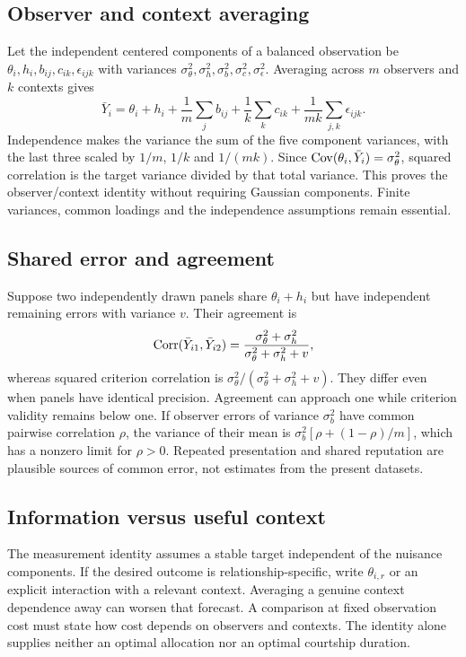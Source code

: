 \subsection{Observer and context averaging}
Let the independent centered components of a balanced observation be $\theta_i,h_i,b_{ij},c_{ik},\epsilon_{ijk}$ with variances $\sigma_\theta^2,\sigma_h^2,\sigma_b^2,\sigma_c^2,\sigma_\epsilon^2$. Averaging across $m$ observers and $k$ contexts gives
\begin{equation}
\bar Y_i=\theta_i+h_i+\frac1m\sum_jb_{ij}+\frac1k\sum_kc_{ik}+\frac1{mk}\sum_{j,k}\epsilon_{ijk}.
\end{equation}
Independence makes the variance the sum of the five component variances, with the last three scaled by $1/m$, $1/k$ and $1/(mk)$. Since $\operatorname{Cov}(\theta_i,\bar Y_i)=\sigma_\theta^2$, squared correlation is the target variance divided by that total variance. This proves the observer/context identity without requiring Gaussian components. Finite variances, common loadings and the independence assumptions remain essential.

\subsection{Shared error and agreement}
Suppose two independently drawn panels share $\theta_i+h_i$ but have independent remaining errors with variance $v$. Their agreement is
\begin{equation}
\operatorname{Corr}(\bar Y_{i1},\bar Y_{i2})=\frac{\sigma_\theta^2+\sigma_h^2}{\sigma_\theta^2+\sigma_h^2+v},
\end{equation}
whereas squared criterion correlation is $\sigma_\theta^2/(\sigma_\theta^2+\sigma_h^2+v)$. They differ even when panels have identical precision. Agreement can approach one while criterion validity remains below one. If observer errors of variance $\sigma_b^2$ have common pairwise correlation $\rho$, the variance of their mean is $\sigma_b^2[\rho+(1-\rho)/m]$, which has a nonzero limit for $\rho>0$. Repeated presentation and shared reputation are plausible sources of common error, not estimates from the present datasets.

\subsection{Information versus useful context}
The measurement identity assumes a stable target independent of the nuisance components. If the desired outcome is relationship-specific, write $\theta_{i,r}$ or an explicit interaction with a relevant context. Averaging a genuine context dependence away can worsen that forecast. A comparison at fixed observation cost must state how cost depends on observers and contexts. The identity alone supplies neither an optimal allocation nor an optimal courtship duration.

